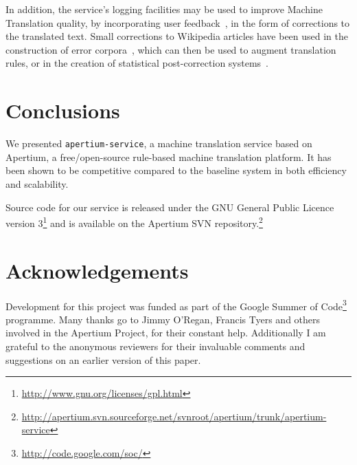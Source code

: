 \documentclass[11pt]{article}
\begin{document}
In addition, the service's logging facilities may be used to improve Machine Translation quality, by incorporating user feedback~\citep{google}, in the form of corrections to the translated text. Small corrections to Wikipedia articles have been used in the construction of error corpora~\citep{milek08}, which can then be used to augment translation rules, or in the creation of statistical post-correction systems~\citep{dugast07}.


\section{Conclusions}

We presented {\tt\small apertium-service}, a machine translation service based on Apertium, a free/open-source rule-based machine translation platform. It has been shown to be competitive compared to the baseline system in both efficiency and scalability.

Source code for our service is released under the GNU General Public Licence version 3\footnote{\small\url{http://www.gnu.org/licenses/gpl.html}} and is available on the Apertium SVN repository.\footnote{{\small\url{http://apertium.svn.sourceforge.net/svnroot/apertium/trunk/apertium-service}}}

\section*{Acknowledgements}

Development for this project was funded as part of the Google Summer of Code\footnote{\small\url{http://code.google.com/soc/}} programme.
Many thanks go to Jimmy O'Regan, Francis Tyers and others involved in the Apertium Project, for their constant help. Additionally I am grateful to the anonymous reviewers for their invaluable comments and suggestions on an earlier version of this paper.



\end{document}
